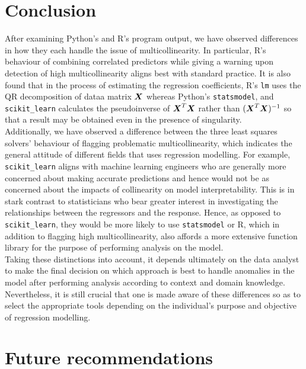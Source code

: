 \documentclass[12pt]{article}
\begin{document}
	\section{Conclusion}
	
	After examining Python's and R's program output, we have observed differences in how they each handle the issue of multicollinearity. In particular, R's behaviour of combining correlated predictors while giving a warning upon detection of high multicollinearity aligns best with standard practice. It is also found that in the process of estimating the regression coefficients, R's \texttt{lm} uses the QR decomposition of dataa matrix $\boldsymbol{X}$ whereas Python's \texttt{statsmodel}, and \texttt{scikit\_learn} calculates the pseudoinverse of $\boldsymbol{X}^T\boldsymbol{X}$ rather than $(\boldsymbol{X}^T\boldsymbol{X})^{-1}$ so that a result may be obtained even in the presence of singularity.\\
	
	Additionally, we have observed a difference between the three least squares solvers' behaviour of flagging problematic multicollinearity, which indicates the general attitude of different fields that uses regression modelling. For example, \texttt{scikit\_learn} aligns with machine learning engineers who are generally more concerned about making accurate predictions and hence would not be as concerned about the impacts of collinearity on model interpretability. This is in stark contrast to statisticians who bear greater interest in investigating the relationships between the regressors and the response. Hence, as opposed to \texttt{scikit\_learn}, they would be more likely to use \texttt{statsmodel} or R, which in addition to flagging high multicollinearity, also affords a more extensive function library for the purpose of performing analysis on the model.\\
	
	Taking these distinctions into account, it depends ultimately on the data analyst to make the final decision on which approach is best to handle anomalies in the model after performing analysis according to context and domain knowledge. Nevertheless, it is still crucial that one is made aware of these differences so as to select the appropriate tools depending on the individual's purpose and objective of regression modelling. 
	
	\section{Future recommendations\label{sec:future-rec}}
	
\end{document}
